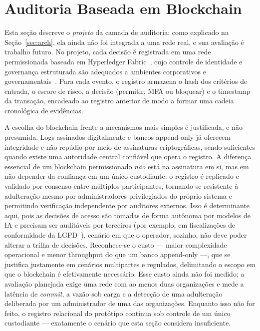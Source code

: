 \documentclass[conference]{IEEEtran}
\begin{document}
\section{Auditoria Baseada em Blockchain}
\label{sec:bc}
Esta seção descreve o \emph{projeto} da camada de auditoria; como
explicado na Seção~\ref{sec:arch}, ela ainda não foi integrada a uma rede
real, e sua avaliação é trabalho futuro. No projeto, cada decisão é
registrada em uma rede permissionada
baseada em Hyperledger Fabric~\cite{fabric2024}, cujo controle de
identidade e governança estruturada são adequados a ambientes
corporativos e governamentais~\cite{nistir8202}. Para cada evento, o
registro armazena o hash dos critérios de entrada, o escore de risco, a
decisão (permitir, MFA ou bloquear) e o timestamp da transação, encadeado
ao registro anterior de modo a formar uma cadeia cronológica de
evidências.

A escolha do blockchain frente a mecanismos mais simples é justificada, e
não presumida. Logs assinados digitalmente e bancos append-only já
oferecem integridade e não repúdio por meio de assinaturas
criptográficas, sendo suficientes quando existe uma autoridade central
confiável que opera o registro. A diferença essencial de um blockchain
permissionado \emph{não} está na assinatura em si, mas em não depender da
confiança em um único custodiante: o registro é replicado e validado por
consenso entre múltiplos participantes, tornando-se resistente à
adulteração mesmo por administradores privilegiados do próprio sistema e
permitindo verificação independente por auditores externos. Isso é
determinante aqui, pois as decisões de acesso são tomadas de forma
autônoma por modelos de IA e precisam ser auditáveis por terceiros (por
exemplo, em fiscalizações de conformidade da LGPD~\cite{lgpd2018}),
cenário em que o operador, sozinho, não deve poder alterar a trilha de
decisões. Reconhece-se o custo --- maior complexidade operacional e menor
throughput do que um banco append-only ---, que se justifica justamente
em cenários multipartes e regulados, delimitando o escopo em que o
blockchain é efetivamente necessário. Esse custo ainda não foi medido; a
avaliação planejada exige uma rede com ao menos duas organizações e
mede a latência de \emph{commit}, a vazão sob carga e a detecção de uma
adulteração deliberada por um administrador de uma das organizações.
Enquanto isso não for feito, o registro relacional do protótipo continua
sob controle de um único custodiante --- exatamente o cenário que esta
seção considera insuficiente.
\end{document}
